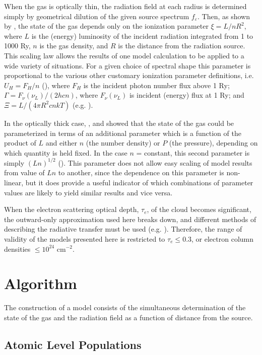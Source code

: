 When the gas is optically thin, the
radiation field at each radius is determined simply by   geometrical
dilution of the given source spectrum $f_\varepsilon$.  
Then, as shown by \cite{Tarter1969},
the state of the gas depends only on the ionization parameter  $\xi=L/nR^2$, 
where $L$ is the (energy) luminosity of the incident radiation integrated from 1 to 1000 Ry,
$n$ is the gas density, and $R$ is the distance from the radiation source.  This
scaling law allows the results of one model   calculation to be
applied to a wide variety of situations.  For a given choice of
spectral shape this parameter   is
proportional to the  various other customary ionization parameter 
definitions, i.e.  $U_H=F_H/n$
(\cite{Davidson1979}), where $F_H$ is the incident photon number 
flux above 1 Ry; $\Gamma=F_\nu(\nu_L)/(2hcn)$, where 
$F_\nu(\nu_L)$ is incident (energy) flux at 1 Ry; and  
$\Xi=L/(4\pi R^2 cnkT)$ (e.g. \cite{Krolik1981}).

In the optically thick case, 
 \cite{Hatchett1976}, and \cite{Kallman1983}
showed that the state of the gas could be  
parameterized in terms of an additional parameter which is a
function of the product of $L$ and either $n$ (the number density) 
or $P$ (the pressure), depending on which quantity is held fixed. 
In the case $n$ = constant, 
this second parameter is simply $(Ln)^{1/2}$ (\cite{McCray1977}).
This parameter does not allow easy scaling of model results from 
value of $Ln$ to another, since the dependence on this parameter 
is non-linear, but it does provide a useful indicator of which 
combinations of parameter values are likely to yield similar results
and vice versa.

When the electron scattering optical depth, $\tau_e$, of the cloud
becomes significant, the outward-only approximation used here breaks
down, and different methods of describing the radiative
transfer must be used (e.g. \cite{Ross1979}). Therefore, the range of 
validity of the models presented here is restricted to $\tau_e\le0.3$,
or electron column densities $\le10^{24}$ cm$^{-2}$.

\section{Algorithm}

The construction of a model consists
of the simultaneous determination of the state of the   gas and the
radiation field as a function of distance from the source. 

\subsection{Atomic Level Populations}

